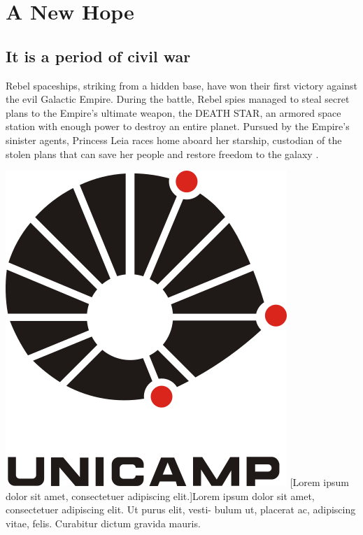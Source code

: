 \chapter{A New Hope}
\section{It is a period of civil war}
Rebel spaceships, striking from a hidden base, have won 
their first victory against the evil Galactic Empire.  
During the battle, Rebel spies managed to steal secret 
plans to the Empire's ultimate weapon, the DEATH STAR, 
an armored space station with enough power to destroy 
an entire planet. Pursued by the Empire's sinister 
agents, Princess Leia races home aboard her starship, 
custodian of the stolen plans that can save her people 
and restore freedom to the galaxy \cite{bib_skywalker77, bib_vader77, bib_kenobi77}.

\lipsum[1-3]

\begin{center}
\includegraphics[width=.35\textwidth]{Images/unicamp.png}
[Lorem ipsum dolor sit amet, consectetuer adipiscing elit.]{Lorem ipsum dolor sit amet, consectetuer adipiscing elit. Ut purus elit, vesti- bulum ut, placerat ac, adipiscing vitae, felis. Curabitur dictum gravida mauris.}
\end{center}

\lipsum[1-3]

\begin{longcitation}
\lipsum[1]
\end{longcitation}

\lipsum[4-10]
